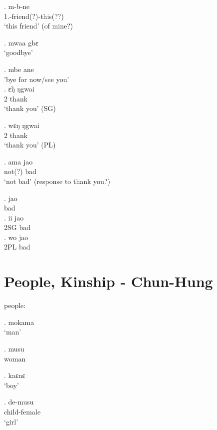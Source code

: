 \documentclass{assets/fieldnotes}
\begin{document}
\exg. m-b-ne\\
1\Sg{}.\Poss{}-friend(?)-this(??)\\
`this friend' (of mine?) 

\ex. mwaa gbɛ\\
`goodbye' 

\ex. mbe ane\\
'bye for now/see you' \\

\exg. ɛ̃ŋ ŋgwai\\
2 thank\\
`thank you' (SG)

\exg. wɛŋ ŋgwai\\
2 thank\\
`thank you' (PL)

\exg. ama jao\\
not(?) bad\\
`not bad' (response to thank you?)

\ex. jao\\
bad\\

\exg. ii jao\\
2SG bad\\

\exg. wo jao\\
2PL bad\\



\section{People, Kinship - Chun-Hung}

people:

\ex. mokama \\
`man' 

\ex. musu \\
woman 

\ex. kaɛnɛ \\
`boy' 

\ex. de-musu \\
child-female \\
`girl'
\end{document}
